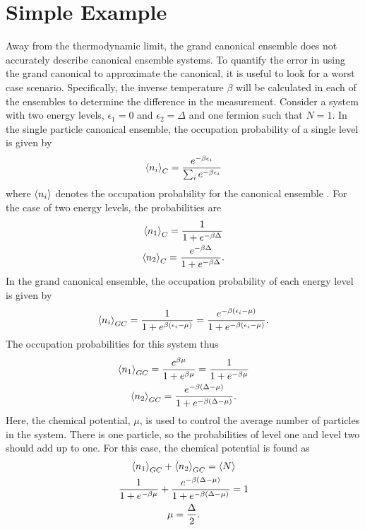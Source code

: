 \section{Simple Example}\label{section:simpleexample}
Away from the thermodynamic limit, the grand canonical ensemble does not accurately describe canonical ensemble systems. To quantify the error in using the grand canonical to approximate the canonical, it is useful to look for a worst case scenario.
Specifically, the inverse temperature $\beta$ will be calculated in each of the ensembles to determine the difference in the measurement. Consider a system with two energy levels, $\epsilon_1=0$ and $\epsilon_2=\Delta$ and one fermion such that $N=1$. In the single particle canonical ensemble, the occupation probability of a single level is given by
\begin{equation}
    \left<{n_i}\right>_C=\frac{e^{-\beta\epsilon_i}}{\sum_i e^{-\beta\epsilon_i}}
\end{equation}
where $\left<{n_i}\right>$ denotes the occupation probability for the canonical ensemble \cite{Kardar}. 
For the case of two energy levels, the probabilities are 
\begin{gather}
    \left<{n_1}\right>_C=\frac{1}{1+e^{-\beta\Delta}}\\
    \left<{n_2}\right>_C=\frac{e^{-\beta\Delta}}{1+e^{-\beta\Delta}}.
\end{gather}
In the grand canonical ensemble, the occupation probability of each energy level is given by 
\begin{equation}
    \left<{n_i}\right>_{GC}=\frac{1}{1+e^{\beta(\epsilon_i-\mu)}}=\frac{e^{-\beta(\epsilon_i-\mu )}}{1+e^{-\beta(\epsilon_i-\mu)}}. \label{GCoccprobab}
\end{equation}
The occupation probabilities for this system thus 
\begin{gather}
    \left<{n_1}\right>_{GC}=\frac{e^{\beta\mu}}{1+e^{\beta\mu}}=\frac{1}{1+e^{-\beta\mu}}\\
    \left<{n_2}\right>_{GC}=\frac{e^{-\beta(\Delta-\mu)}}{1+ e^{-\beta(\Delta-\mu)}}.
\end{gather}
Here, the chemical potential, $\mu$, is used to control the average number of particles in the system. There is one particle, so the probabilities of level one and level two should add up to one. For this case, the chemical potential is found as 
\begin{gather}
    \left<{n_1}\right>_{GC}+\left<{n_2}\right>_{GC}=\left<{N}\right>\nonumber\\
    \frac{1}{1+e^{-\beta\mu}}+\frac{e^{-\beta(\Delta-\mu)}}{1+e^{-\beta(\Delta-\mu)}}=1\nonumber\\
    \mu=\frac{\Delta}{2}.
\end{gather}
